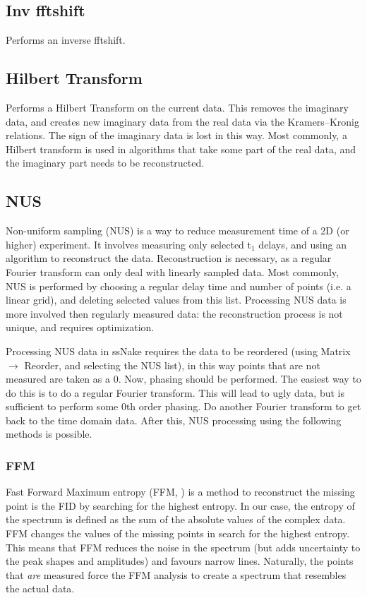 \documentclass[11pt,a4paper]{article}
\begin{document}
\subsection{Inv fftshift}
Performs an inverse fftshift.


\subsection{Hilbert Transform}
Performs a Hilbert Transform on the current data. This removes the imaginary data, and creates new imaginary data from the real data
via the Kramers--Kronig relations. The sign of the imaginary data is lost in this way. Most commonly, a Hilbert transform is
used in algorithms that take some part of the real data, and the imaginary part needs to be reconstructed.


\subsection{NUS}
Non-uniform sampling (NUS) is a way to reduce measurement time of a 2D (or higher) experiment. It involves measuring only selected t$_1$ delays, and using
an algorithm to reconstruct the data. Reconstruction is necessary, as a regular Fourier transform can only deal with linearly sampled data.
Most commonly, NUS is performed by choosing a regular delay time and number of points (i.e. a linear grid), and deleting selected values from this list.
Processing NUS data is more involved then regularly measured data: the reconstruction process is not unique, and requires optimization.

Processing NUS data in ssNake requires the data to be reordered (using Matrix $\rightarrow$ Reorder, and selecting the NUS list), in this way
points that are not measured are taken as a 0. Now, phasing should be performed. The easiest way to do this is to do a regular Fourier transform. This will lead to ugly data, but 
is sufficient to perform some 0th order phasing. Do another Fourier transform to get back to the time domain data. After this, NUS processing using the following methods is possible.

\subsubsection{FFM}
Fast Forward Maximum entropy (FFM, \cite{balsgart2012fast}) is a method to reconstruct the missing point is the FID by searching for the highest entropy. In our case, the entropy of the spectrum is defined 
as the sum of the absolute values of the complex data. FFM changes the values of the missing points in search for the highest entropy. This means that FFM reduces
the noise in the spectrum (but adds uncertainty to the peak shapes and amplitudes) and favours narrow lines. Naturally, the points that \textit{are} measured force the FFM analysis to 
create a spectrum that resembles the actual data.
\end{document}
